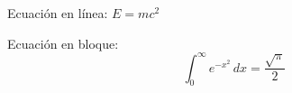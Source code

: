 \documentclass{article}
\begin{document}
Ecuación en línea: $E=mc^2$

Ecuación en bloque:
\[ \int_{0}^{\infty} e^{-x^2} \, dx = \frac{\sqrt{\pi}}{2} \]
\end{document}
